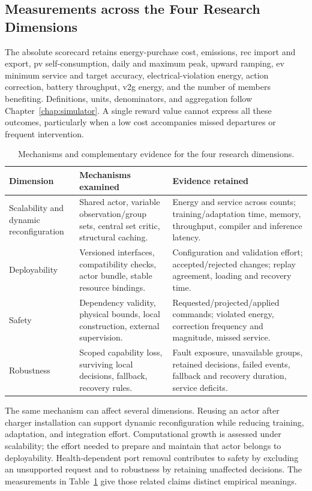 \subsection{Measurements across the Four Research Dimensions}
\label{sec:timarl-measures}

The absolute scorecard retains energy-purchase cost, emissions, \gls{rec} import and export, \gls{pv} self-consumption, daily and maximum peak, upward ramping, \gls{ev} minimum service and target accuracy, electrical-violation energy, action correction, battery throughput, \gls{v2g} energy, and the number of members benefiting. Definitions, units, denominators, and aggregation follow Chapter~\ref{chap:simulator}. A single reward value cannot express all these outcomes, particularly when a low cost accompanies missed departures or frequent intervention.

\begin{table}[htbp]
\centering
\small
\caption{Mechanisms and complementary evidence for the four research dimensions.}
\label{tab:timarl-four-dimensions}
\begin{tabularx}{\textwidth}{@{}p{}p{}X@{}}
\toprule
\textbf{Dimension} & \textbf{Mechanisms examined} & \textbf{Evidence retained}\\
\midrule
Scalability and dynamic reconfiguration & Shared actor, variable observation/group sets, central set critic, structural caching. & Energy and service across counts; training/adaptation time, memory, throughput, compiler and inference latency.\\
\addlinespace
Deployability & Versioned interfaces, compatibility checks, actor bundle, stable resource bindings. & Configuration and validation effort; accepted/rejected changes; replay agreement, loading and recovery time.\\
\addlinespace
Safety & Dependency validity, physical bounds, local construction, external supervision. & Requested/projected/applied commands; violated energy, correction frequency and magnitude, missed service.\\
\addlinespace
Robustness & Scoped capability loss, surviving local decisions, fallback, recovery rules. & Fault exposure, unavailable groups, retained decisions, failed events, fallback and recovery duration, service deficits.\\
\bottomrule
\end{tabularx}
\end{table}

The same mechanism can affect several dimensions. Reusing an actor after charger installation can support dynamic reconfiguration while reducing training, adaptation, and integration effort. Computational growth is assessed under scalability; the effort needed to prepare and maintain that actor belongs to deployability. Health-dependent port removal contributes to safety by excluding an unsupported request and to robustness by retaining unaffected decisions. The measurements in Table~\ref{tab:timarl-four-dimensions} give those related claims distinct empirical meanings.

